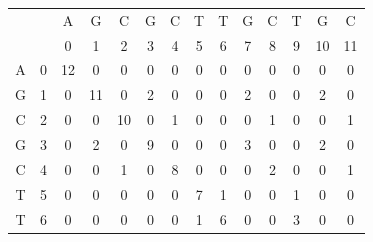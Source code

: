 \documentclass[times, utf8, zavrsni]{fer}
\begin{document}
\begin{table}[]
\centering
\begin{tabular}{|cc|cccccccccccc|}
\hline
 &  & A & G & C & G & C & T & T & G & C & T & G & C \\ \cline{3-14} 
 &  & 0 & 1 & 2 & 3 & 4 & 5 & 6 & 7 & 8 & 9 & 10 & 11 \\ \hline
\multicolumn{1}{|c|}{A} & 0 & \multicolumn{1}{c|}{12} & \multicolumn{1}{c|}{0} & \multicolumn{1}{c|}{0} & \multicolumn{1}{c|}{0} & \multicolumn{1}{c|}{0} & \multicolumn{1}{c|}{0} & \multicolumn{1}{c|}{0} & \multicolumn{1}{c|}{0} & \multicolumn{1}{c|}{0} & \multicolumn{1}{c|}{0} & \multicolumn{1}{c|}{0} & 0 \\ \cline{3-14} 
\multicolumn{1}{|c|}{G} & 1 & \multicolumn{1}{c|}{0} & \multicolumn{1}{c|}{11} & \multicolumn{1}{c|}{0} & \multicolumn{1}{c|}{2} & \multicolumn{1}{c|}{0} & \multicolumn{1}{c|}{0} & \multicolumn{1}{c|}{0} & \multicolumn{1}{c|}{2} & \multicolumn{1}{c|}{0} & \multicolumn{1}{c|}{0} & \multicolumn{1}{c|}{2} & 0 \\ \cline{3-14} 
\multicolumn{1}{|c|}{C} & 2 & \multicolumn{1}{c|}{0} & \multicolumn{1}{c|}{0} & \multicolumn{1}{c|}{10} & \multicolumn{1}{c|}{0} & \multicolumn{1}{c|}{1} & \multicolumn{1}{c|}{0} & \multicolumn{1}{c|}{0} & \multicolumn{1}{c|}{0} & \multicolumn{1}{c|}{1} & \multicolumn{1}{c|}{0} & \multicolumn{1}{c|}{0} & 1 \\ \cline{3-14} 
\multicolumn{1}{|c|}{G} & 3 & \multicolumn{1}{c|}{0} & \multicolumn{1}{c|}{2} & \multicolumn{1}{c|}{0} & \multicolumn{1}{c|}{9} & \multicolumn{1}{c|}{0} & \multicolumn{1}{c|}{0} & \multicolumn{1}{c|}{0} & \multicolumn{1}{c|}{3} & \multicolumn{1}{c|}{0} & \multicolumn{1}{c|}{0} & \multicolumn{1}{c|}{2} & 0 \\ \cline{3-14} 
\multicolumn{1}{|c|}{C} & 4 & \multicolumn{1}{c|}{0} & \multicolumn{1}{c|}{0} & \multicolumn{1}{c|}{1} & \multicolumn{1}{c|}{0} & \multicolumn{1}{c|}{8} & \multicolumn{1}{c|}{0} & \multicolumn{1}{c|}{0} & \multicolumn{1}{c|}{0} & \multicolumn{1}{c|}{2} & \multicolumn{1}{c|}{0} & \multicolumn{1}{c|}{0} & 1 \\ \cline{3-14} 
\multicolumn{1}{|c|}{T} & 5 & \multicolumn{1}{c|}{0} & \multicolumn{1}{c|}{0} & \multicolumn{1}{c|}{0} & \multicolumn{1}{c|}{0} & \multicolumn{1}{c|}{0} & \multicolumn{1}{c|}{7} & \multicolumn{1}{c|}{1} & \multicolumn{1}{c|}{0} & \multicolumn{1}{c|}{0} & \multicolumn{1}{c|}{1} & \multicolumn{1}{c|}{0} & 0 \\ \cline{3-14} 
\multicolumn{1}{|c|}{T} & 6 & \multicolumn{1}{c|}{0} & \multicolumn{1}{c|}{0} & \multicolumn{1}{c|}{0} & \multicolumn{1}{c|}{0} & \multicolumn{1}{c|}{0} & \multicolumn{1}{c|}{1} & \multicolumn{1}{c|}{6} & \multicolumn{1}{c|}{0} & \multicolumn{1}{c|}{0} & \multicolumn{1}{c|}{3} & \multicolumn{1}{c|}{0} & 0 \\ \cline{3-14} 

\end{tabular}
\end{table}
\end{document}
